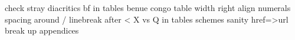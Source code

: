 check stray diacritics  
bf in tables
benue congo table width 
right align numerals 
spacing around /
linebreak after <
X vs Q in tables
schemes
sanity
href=>url
break up appendices